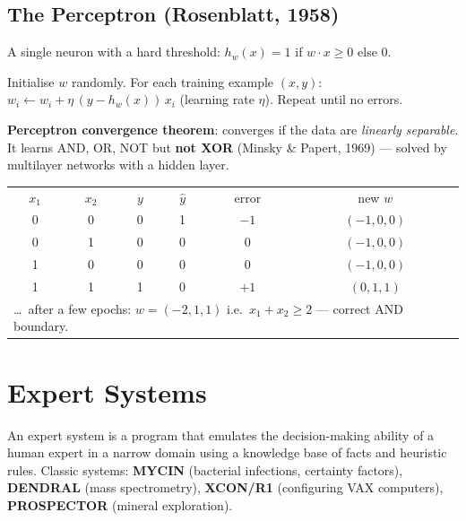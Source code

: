 \subsection{The Perceptron (Rosenblatt, 1958)}
A single neuron with a hard threshold: $h_w(x)=1$ if $w\cdot x\ge0$ else $0$.
\begin{algo}
Initialise $w$ randomly. For each training example $(x,y)$: \quad $w_i\leftarrow w_i+\eta\,(y-h_w(x))\,x_i$ \quad (learning rate $\eta$). Repeat until no errors.
\end{algo}
\textbf{Perceptron convergence theorem}: converges if the data are \emph{linearly separable}. It learns AND, OR, NOT but \textbf{not XOR} (Minsky \& Papert, 1969) --- solved by multilayer networks with a hidden layer.
\begin{example}[Training a perceptron for AND ($\eta=1$, $w=(w_0,w_1,w_2)=(0,0,0)$, $x_0=1$)]
\small
\begin{tabular}{cccccc}
\rowcolor{navy}\color{gold}$x_1$&\color{gold}$x_2$&\color{gold}$y$&\color{gold}$\hat y$&\color{gold}error&\color{gold}new $w$\\
0&0&0&1&$-1$&$(-1,0,0)$\\ \rowcolor{ivory}0&1&0&0&0&$(-1,0,0)$\\ 1&0&0&0&0&$(-1,0,0)$\\ \rowcolor{ivory}1&1&1&0&$+1$&$(0,1,1)$\\
\multicolumn{6}{l}{\dots\ after a few epochs: $w=(-2,1,1)$ i.e.\ $x_1+x_2\ge2$ --- correct AND boundary.}\\
\end{tabular}
\end{example}

\section{Expert Systems}
An expert system is a program that emulates the decision-making ability of a human expert in a narrow domain using a knowledge base of facts and heuristic rules. Classic systems: \textbf{MYCIN} (bacterial infections, certainty factors), \textbf{DENDRAL} (mass spectrometry), \textbf{XCON/R1} (configuring VAX computers), \textbf{PROSPECTOR} (mineral exploration).
